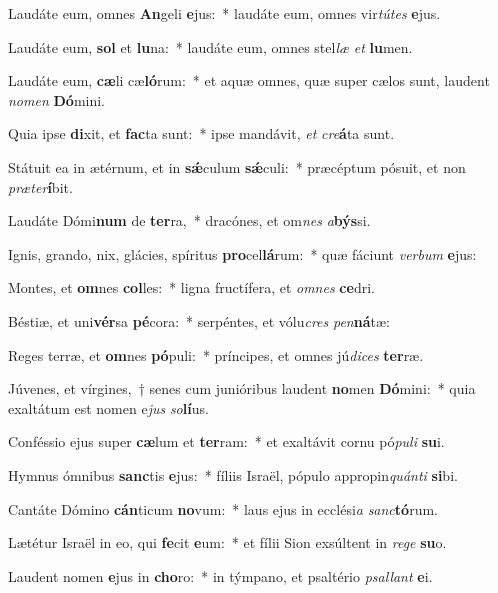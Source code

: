 \item Laudáte eum, omnes \textbf{An}geli \textbf{e}jus:~* laudáte eum, omnes vir\textit{tú}\textit{tes} \textbf{e}jus.
\item Laudáte eum, \textbf{sol} et \textbf{lu}na:~* laudáte eum, omnes stel\textit{læ} \textit{et} \textbf{lu}men.
\item Laudáte eum, \textbf{cæ}li cæ\textbf{ló}rum:~* et aquæ omnes, quæ super cælos sunt, laudent \textit{no}\textit{men} \textbf{Dó}mini.
\item Quia ipse \textbf{di}xit, et \textbf{fac}ta sunt:~* ipse mandávit, \textit{et} \textit{cre}\textbf{á}ta sunt.
\item Státuit ea in ætérnum, et in \textbf{sǽ}culum \textbf{sǽ}culi:~* præcéptum pósuit, et non \textit{præ}\textit{ter}\textbf{í}bit.
\item Laudáte Dómi\textbf{num} de \textbf{ter}ra,~* dracónes, et om\textit{nes} \textit{a}\textbf{býs}si.
\item Ignis, grando, nix, glácies, spíritus \textbf{pro}cel\textbf{lá}rum:~* quæ fáciunt \textit{ver}\textit{bum} \textbf{e}jus:
\item Montes, et \textbf{om}nes \textbf{col}les:~* ligna fructífera, et \textit{om}\textit{nes} \textbf{ce}dri.
\item Béstiæ, et uni\textbf{vér}sa \textbf{pé}cora:~* serpéntes, et vólu\textit{cres} \textit{pen}\textbf{ná}tæ:
\item Reges terræ, et \textbf{om}nes \textbf{pó}puli:~* príncipes, et omnes jú\textit{di}\textit{ces} \textbf{ter}ræ.
\item Júvenes, et vírgines,~† senes cum junióribus laudent \textbf{no}men \textbf{Dó}mini:~* quia exaltátum est nomen e\textit{jus} \textit{so}\textbf{lí}us.
\item Conféssio ejus super \textbf{cæ}lum et \textbf{ter}ram:~* et exaltávit cornu pó\textit{pu}\textit{li} \textbf{su}i.
\item Hymnus ómnibus \textbf{sanc}tis \textbf{e}jus:~* fíliis Israël, pópulo appropin\textit{quán}\textit{ti} \textbf{si}bi.
\item Cantáte Dómino \textbf{cán}ticum \textbf{no}vum:~* laus ejus in ecclési\textit{a} \textit{sanc}\textbf{tó}rum.
\item Lætétur Israël in eo, qui \textbf{fe}cit \textbf{e}um:~* et fílii Sion exsúltent in \textit{re}\textit{ge} \textbf{su}o.
\item Laudent nomen \textbf{e}jus in \textbf{cho}ro:~* in týmpano, et psaltério \textit{psal}\textit{lant} \textbf{e}i.
